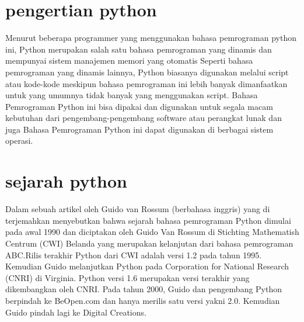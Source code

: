 
\section{pengertian python}
     
      Menurut beberapa  programmer yang menggunakan bahasa pemrograman python ini, Python merupakan salah satu bahasa pemrograman 
      yang dinamis dan mempunyai sistem manajemen memori yang otomatis Seperti bahasa pemrograman yang dinamis lainnya, Python 
      biasanya digunakan melalui script atau kode-kode meskipun bahasa pemrograman ini lebih banyak dimanfaatkan untuk yang umumnya
      tidak banyak yang menggunakan script. Bahasa Pemrograman Python ini bisa dipakai dan digunakan untuk segala macam kebutuhan 
      dari pengembang-pengembang software atau perangkat lunak dan juga Bahasa Pemrograman Python ini dapat digunakan di berbagai 
      sistem operasi.
      
 \section {sejarah python}
 
      Dalam sebuah artikel oleh Guido van Rossum (berbahasa inggris) yang di terjemahkan menyebutkan bahwa sejarah bahasa pemrograman 
      Python dimulai pada awal 1990 dan diciptakan oleh Guido Van Rossum di Stichting Mathematish Centrum (CWI) Belanda yang merupakan 
      kelanjutan dari bahasa pemrograman ABC.Rilis terakhir Python dari CWI adalah versi 1.2 pada tahun 1995. Kemudian Guido melanjutkan 
      Python pada Corporation for National Research (CNRI) di Virginia. Python versi 1.6 merupakan versi terakhir yang dikembangkan oleh 
      CNRI. Pada tahun 2000, Guido dan pengembang Python berpindah ke BeOpen.com dan hanya merilis satu versi yakni 2.0. Kemudian 
      Guido pindah lagi ke Digital Creations.


